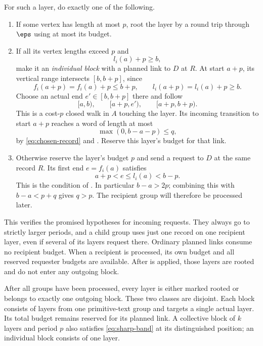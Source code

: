 For such a layer, do exactly one of the following.
\begin{enumerate}[label=\textup{(\roman*)}]
\item If some vertex has length at most $p$, root the layer by a round trip through $\eps$ using at most its budget.
\item If all its vertex lengths exceed $p$ and
\begin{equation}\label{eq:single-test}
l_i(a)+p\ge b,
\end{equation}
make it an \emph{individual block} with a planned link to $D$ at $R$. At start $a+p$, its vertical range intersects $[b,b+p]$, since
\[
f_i(a+p)=f_i(a)+p\le b+p,
\qquad l_i(a+p)=l_i(a)+p\ge b.
\]
Choose an actual end $e'\in[b,b+p]$ there and follow
\begin{equation}\label{eq:individual-list}
[a,b),\qquad[a+p,e'),\qquad[a+p,b+p).
\end{equation}
This is a cost-$p$ closed walk in $A$ touching the layer. Its incoming transition to start $a+p$ reaches a word of length at most
\begin{equation}\label{eq:single-short}
\max(0,b-a-p)\le q,
\end{equation}
by \eqref{eq:chosen-record} and . Reserve this layer's budget for that link.
\item Otherwise reserve the layer's budget $p$ and send a request to $D$ at the same record $R$. Its first end $e=f_i(a)$ satisfies
\begin{equation}\label{eq:outgoing-request}
a+p<e\le l_i(a)<b-p.
\end{equation}
This is the condition of . In particular $b-a>2p$; combining this with $b-a<p+q$ gives $q>p$. The recipient group will therefore be processed later.
\end{enumerate}

This verifies the promised hypotheses for incoming requests. They always go to strictly larger periods, and a child group uses just one record on one recipient layer, even if several of its layers request there. Ordinary planned links consume no recipient budget. When a recipient is processed, its own budget and all reserved requester budgets are available. After  is applied, those layers are rooted and do not enter any outgoing block.

\begin{proposition}\label{prop:partition}
After all groups have been processed, every layer is either marked rooted or belongs to exactly one outgoing block. These two classes are disjoint. Each block consists of layers from one primitive-text group and targets a single actual layer. Its total budget remains reserved for its planned link. A collective block of $k$ layers and period $p$ also satisfies \eqref{eq:sharp-band} at its distinguished position; an individual block consists of one layer.
\end{proposition}

